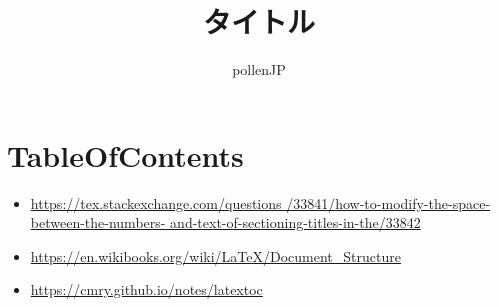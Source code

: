 \documentclass{jsarticle}           %
\title{タイトル}
\author{pollenJP}
\theoremstyle{plain}
\theoremstyle{definition}
\theoremstyle{remark}
\begin{document}
    
\maketitle
    
\renewcommand\contentsname{目次（もくじだよ）}
\tableofcontents
{}
    
\section{TableOfContents}
\begin{itemize}
  \item \url{https://tex.stackexchange.com/questions
              /33841/how-to-modify-the-space-between-the-numbers-
              and-text-of-sectioning-titles-in-the/33842
        }
  \item \url{https://en.wikibooks.org/wiki/LaTeX/Document_Structure}
  \item \url{https://cmry.github.io/notes/latextoc}
\end{itemize}
\end{document}
